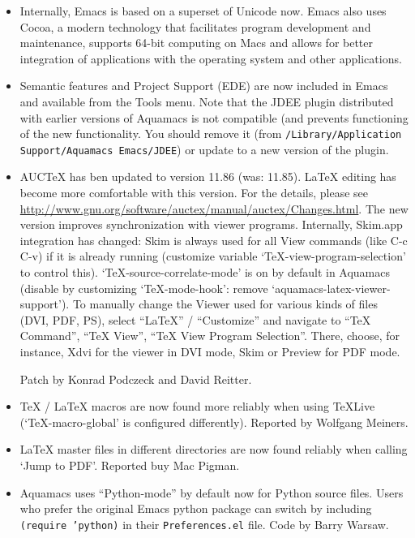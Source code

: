 \begin{itemize}


\item Internally, Emacs is based on a superset of Unicode now.  Emacs also uses Cocoa, a modern technology that facilitates program development and maintenance, supports 64-bit computing on Macs and allows for better integration of applications with the operating system and other applications.

\item Semantic features and Project Support (EDE) are now included in Emacs and available from the Tools menu.  Note that the JDEE plugin distributed with earlier versions of Aquamacs is not compatible (and prevents functioning of the new functionality.  You should remove it (from {\tt /Library/Application Support/Aquamacs Emacs/JDEE}) or update to a new version of the plugin.

\item AUCTeX has ben updated to version 11.86 (was: 11.85).  LaTeX editing has become more comfortable with this version. For the details, please see {\small \url{http://www.gnu.org/software/auctex/manual/auctex/Changes.html}}.  The new version improves synchronization with viewer programs. Internally, Skim.app integration has changed: Skim is always used for all View commands (like C-c C-v)  if it is already running (customize variable `TeX-view-program-selection' to control this).  `TeX-source-correlate-mode' is on by default in Aquamacs (disable by customizing `TeX-mode-hook': remove `aquamacs-latex-viewer-support').  To manually change the Viewer used for various kinds of files (DVI, PDF, PS), select ``LaTeX'' / ``Customize'' and navigate to ``TeX Command'', ``TeX View'', ``TeX View Program Selection''. There, choose, for instance, Xdvi for the viewer in DVI mode, Skim or Preview for PDF mode.

Patch by Konrad Podczeck and David Reitter.

\item TeX / LaTeX macros are now found more reliably when using TeXLive (`TeX-macro-global' is configured differently).
Reported by Wolfgang Meiners.  %

\item LaTeX master files in different directories are now found reliably when calling `Jump to PDF'.
Reported buy Mac Pigman.  %

\item Aquamacs uses ``Python-mode'' by default now for Python source files.  Users who prefer the original Emacs python package can switch by including {\tt (require 'python)} in their {\tt Preferences.el} file.
Code by Barry Warsaw.


\end{itemize}
